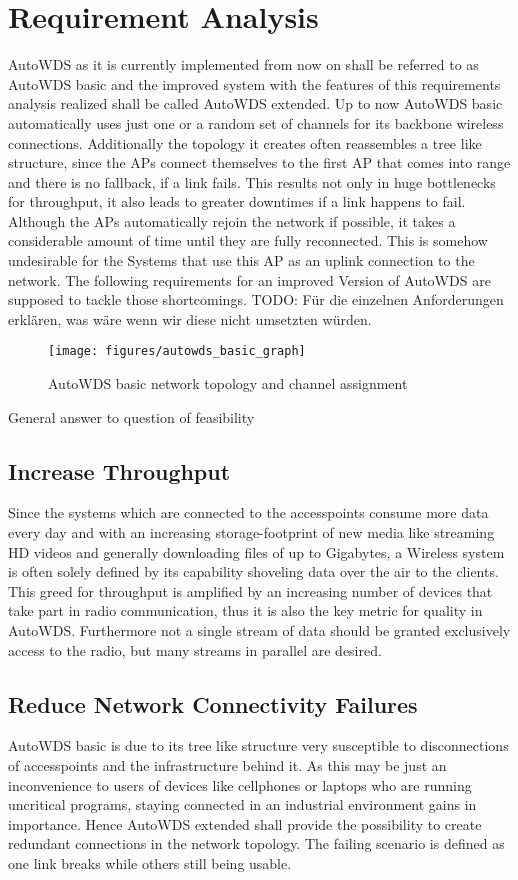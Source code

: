 \chapter{Requirement Analysis}
  AutoWDS as it is currently implemented from now on shall be referred to as 
  AutoWDS basic and the improved system with the features of this requirements analysis realized shall be called AutoWDS extended.
  Up to now AutoWDS basic automatically uses just one or a random set of channels for its backbone wireless connections. 
  Additionally the topology it creates often reassembles a tree like structure, since the APs connect themselves 
  to the first AP that comes into range and there is no fallback, if a link fails. This results not only in huge bottlenecks for throughput,
  it also leads to greater downtimes if a link happens to fail. Although the APs automatically rejoin the network if possible, it takes
  a considerable amount of time until they are fully reconnected. This is somehow undesirable for the Systems that use this AP as an uplink connection to
  the network. The following requirements for an improved Version of AutoWDS are supposed to tackle those shortcomings.
  TODO: Für die einzelnen Anforderungen erklären, was wäre wenn wir diese nicht umsetzten würden.
  \begin{figure}[t]
    \centering
    \texttt{[image: figures/autowds\_basic\_graph]}
    \caption{AutoWDS basic network topology and channel assignment}
    \label{fig:autowds_basic_graph}
  \end{figure}
General answer to question of feasibility
  \section{Increase Throughput}
  Since the systems which are connected to the accesspoints consume more data every day and with an increasing storage-footprint of new media like streaming HD videos
  and generally downloading files of up to Gigabytes, a Wireless system is often solely defined by its capability shoveling data over the air to the clients.
  This greed for throughput is amplified by an increasing number of devices that take part in radio communication, 
  thus it is also the key metric for quality in AutoWDS. Furthermore not a single stream of data should be granted exclusively access to the radio, but
  many streams in parallel are desired.
  \section{Reduce Network Connectivity Failures}
  AutoWDS basic is due to its tree like structure very susceptible to disconnections of accesspoints and the infrastructure behind it.
  As this may be just an inconvenience to users of devices like cellphones or laptops who are running uncritical programs, 
  staying connected in an industrial environment gains in importance. Hence AutoWDS extended shall provide the possibility to create 
  redundant connections in the network topology. The failing scenario is defined as one link breaks while others still being usable.
